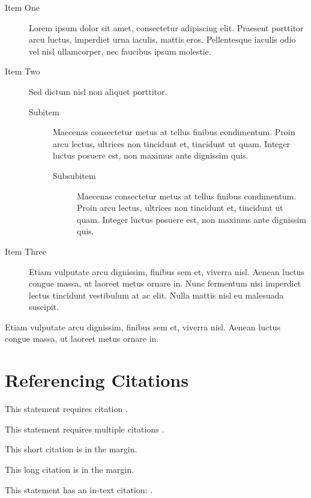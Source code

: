 \documentclass[
	a4paper, %
	12pt, %
]{include/CSSullivanBusinessReport}
\begin{document}
\begin{description}
	\item[Item One] Lorem ipsum dolor sit amet, consectetur adipiscing elit. Praesent porttitor arcu luctus, imperdiet urna iaculis, mattis eros. Pellentesque iaculis odio vel nisl ullamcorper, nec faucibus ipsum molestie.
	\item[Item Two] Sed dictum nisl non aliquet porttitor.
	\begin{description}
		\item[Subitem] Maecenas consectetur metus at tellus finibus condimentum. Proin arcu lectus, ultrices non tincidunt et, tincidunt ut quam. Integer luctus posuere est, non maximus ante dignissim quis.
		\begin{description}
			\item[Subsubitem] Maecenas consectetur metus at tellus finibus condimentum. Proin arcu lectus, ultrices non tincidunt et, tincidunt ut quam. Integer luctus posuere est, non maximus ante dignissim quis.
	\end{description}
	\end{description}
	\item[Item Three] Etiam vulputate arcu dignissim, finibus sem et, viverra nisl. Aenean luctus congue massa, ut laoreet metus ornare in. Nunc fermentum nisi imperdiet lectus tincidunt vestibulum at ac elit. Nulla mattis nisl eu malesuada suscipit.
\end{description}

Etiam vulputate arcu dignissim, finibus sem et, viverra nisl. Aenean luctus congue massa, ut laoreet metus ornare in.


\section{Referencing Citations}

This statement requires citation \autocite{Smith:2024jd}.

This statement requires multiple citations \autocite{Smith:2024jd, Smith:2023qr}.

This short citation is in the margin.

This long citation is in the margin.

This statement has an in-text citation: \textcite{Smith:2024jd}.
\end{document}
